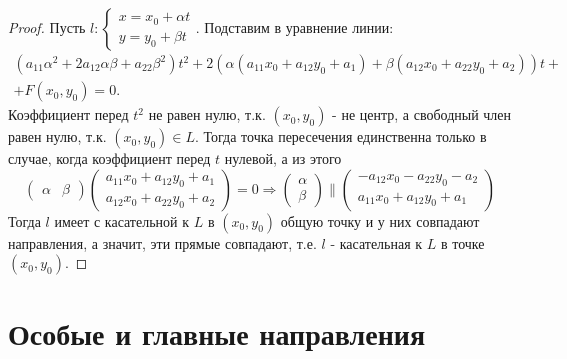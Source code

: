 \documentclass[a4paper, 12pt]{article}
\theoremstyle{definition}
\begin{document}
	\begin{proof}
		Пусть $l: \begin{cases}x = x_0 + \alpha t\\y = y_0 + \beta t\end{cases}$. Подставим в уравнение линии: \begin{align*}
			(a_{11}\alpha^2 + 2a_{12}\alpha\beta + a_{22}\beta^2)t^2 + 2(\alpha(a_{11}x_0 + a_{12}y_0 + a_1) + \beta(a_{12}x_0 + a_{22}y_0 + a_2))t +\\+ F(x_0, y_0) = 0.
		\end{align*}
		Коэффициент перед $t^2$ не равен нулю, т.к. $(x_0, y_0)$ - не центр, а свободный член равен нулю, т.к. $(x_0, y_0)\in L$. Тогда точка пересечения единственна только в случае, когда коэффициент перед $t$ нулевой, а из этого $$\begin{pmatrix} \alpha & \beta \end{pmatrix}\begin{pmatrix} a_{11}x_0 + a_{12}y_0 + a_1 \\ a_{12}x_0 + a_{22}y_0 + a_2 \end{pmatrix} = 0 \Rightarrow \begin{pmatrix} \alpha \\ \beta \end{pmatrix} \parallel \begin{pmatrix} -a_{12}x_0 - a_{22}y_0 - a_2 \\ a_{11}x_0 + a_{12}y_0 + a_1 \end{pmatrix}$$
		Тогда $l$ имеет с касательной к $L$ в $(x_0, y_0)$ общую точку и у них совпадают направления, а значит, эти прямые совпадают, т.е. $l$ - касательная к $L$ в точке $(x_0, y_0)$.
	\end{proof}
	\section{Особые и главные направления}
\end{document}
